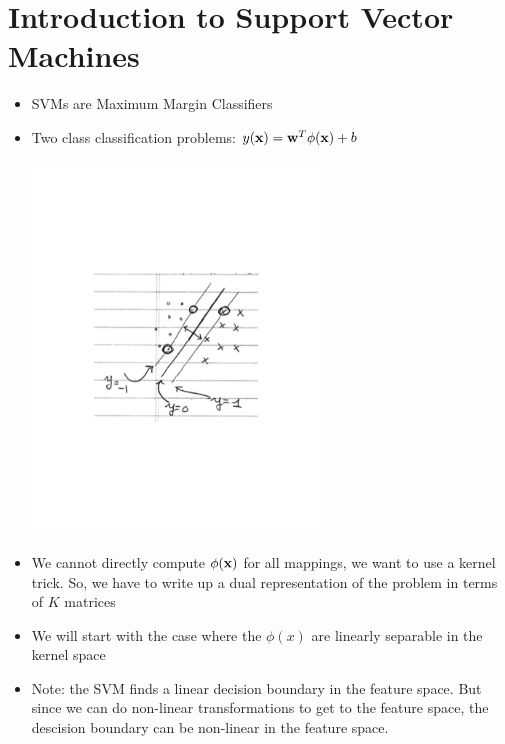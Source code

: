 \documentclass[12pt,letterpaper]{article}
\begin{document}
\section{Introduction to Support Vector Machines}
\begin{itemize}
\item SVMs are Maximum Margin Classifiers 
\item Two class classification problems: $y(\mathbf{x}) = \mathbf{w}^T\phi(\mathbf{x}) + b$

\begin{center}\includegraphics[width=3in, trim=5cm 8cm 5cm 8cm, clip=true]{svm_pic.pdf}\end{center}

\item We cannot directly compute $\phi(\mathbf{x})$ for all mappings, we want to use a kernel trick.  So, we have to write up a dual representation of the problem in terms of $K$ matrices
\item We will start with the case where the $\phi(x)$ are linearly separable in the kernel space
\item Note: the SVM finds a linear decision boundary in the feature space.  But since we can do non-linear transformations to get to the feature space, the descision boundary can be non-linear in the feature space. 

\end{itemize}
\end{document}

